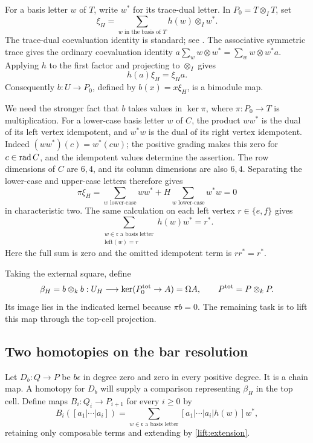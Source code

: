 For a basis letter $w$ of $T$, write $w^*$ for its trace-dual letter.
In $P_0=T\otimes_I T$, set
\begin{equation}
 \xi_H=\sum_{w\text{ in the basis of }T}h(w)\otimes_I w^*.
 \label{lift:casimir}
\end{equation}
The trace-dual coevaluation identity is standard; see \cite[Proposition~3.3]{Broue2009}.
The associative symmetric trace gives the ordinary coevaluation identity
$a\sum_w w\otimes w^*=\sum_w w\otimes w^*a$.
Applying $h$ to the first factor and projecting to $\otimes_I$ gives
\[
 h(a)\xi_H=\xi_Ha.
\]
Consequently $b:U\to P_0$, defined by $b(x)=x\xi_H$, is a bimodule map.

We need the stronger fact that $b$ takes values in $\ker\pi$, where
$\pi:P_0\to T$ is multiplication.  For a lower-case basis letter $w$
of $C$, the product $ww^*$ is the dual of its left vertex idempotent,
and $w^*w$ is the dual of its right vertex idempotent.  Indeed
$(ww^*)(c)=w^*(cw)$; the positive grading makes this zero for
$c\in\operatorname{rad} C$, and the idempotent values determine the assertion.
The row dimensions of $C$ are $6,4$, and its column dimensions are also
$6,4$.  Separating the lower-case and upper-case letters therefore gives
\[
 \pi\xi_H=\sum_{w\text{ lower-case}}ww^*
       +H\sum_{w\text{ lower-case}}w^*w=0
\]
in characteristic two.  The same calculation on each left vertex
$r\in\{e,f\}$ gives
\begin{equation}
 \sum_{\substack{w\in\mathfrak r\text{ a basis letter}\\
                         \mathrm{left}(w)=r}}h(w)w^*=r^*.
 \label{lift:endpoint}
\end{equation}
Here the full sum is zero and the omitted idempotent term is $rr^*=r^*$.

Taking the external square, define
\begin{equation}
 \beta_H=b\otimes_k b:
 U_H\longrightarrow\ker(P^{\mathrm{tot}}_0\to A)=\Omega A,
 \qquad P^{\mathrm{tot}}=P\otimes_k P.
 \label{lift:beta}
\end{equation}
Its image lies in the indicated kernel because $\pi b=0$.
The remaining task is to lift this map through the top-cell projection.

\subsection{Two homotopies on the bar resolution}

Let $D_b:Q\to P$ be $b\epsilon$ in degree zero and zero in every
positive degree.  It is a chain map.  A homotopy for $D_b$ will supply
a comparison representing $\beta_H$ in the top cell.  Define maps $B_i:Q_i\to P_{i+1}$
for every $i\geq0$ by
\begin{equation}
 B_i([a_1|\cdots|a_i])
 =\sum_{w\in\mathfrak r\text{ a basis letter}}
     [a_1|\cdots|a_i|h(w)]w^*,
 \label{lift:Bformula}
\end{equation}
retaining only composable terms and extending by
\eqref{lift:extension}.

